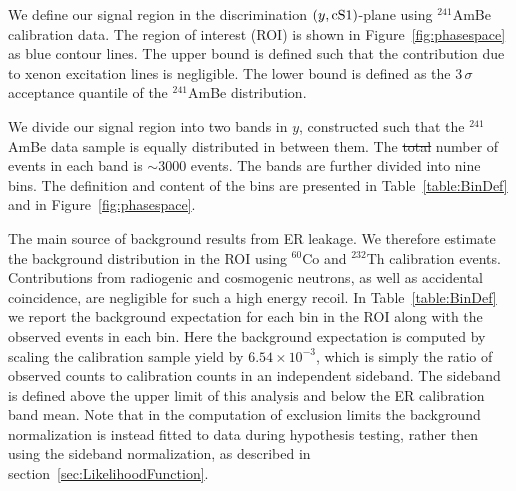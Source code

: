 We define our signal region in the discrimination $(y,\mathrm{cS1})$-plane using $^{241}$AmBe calibration data. 
The region of interest (ROI) is shown in Figure~\ref{fig:phasespace} as blue contour lines. The upper bound is defined such that the contribution due to xenon excitation lines is negligible. The lower bound is defined as the 3\,$\sigma$ acceptance quantile of the $^{241}$AmBe distribution.

We divide our signal region into two bands in $y$, constructed such that the $^{241}$AmBe data sample is equally distributed in between them. The \sout{total} number of events in each band is $\sim3000$ events. The bands are further divided into nine bins. The definition and content of the bins are presented in Table~\ref{table:BinDef} and in Figure~\ref{fig:phasespace}. 

The main source of background results from ER leakage. We therefore estimate the background distribution in the ROI using $^{60}$Co and $^{232}$Th calibration events.  
Contributions from radiogenic and cosmogenic neutrons, as well as accidental coincidence, are negligible for such a high energy recoil. In Table~\ref{table:BinDef} we report the background expectation for each bin in the ROI along with the observed events in each bin. Here the background expectation is computed by scaling the calibration sample yield by $6.54\times10^{-3}$, which is simply the ratio of observed counts to calibration counts in an independent sideband. The sideband is defined above the upper limit of this analysis and below the ER calibration band mean. Note that in the computation of exclusion limits the background normalization is instead fitted to data during hypothesis testing, rather then using the sideband normalization, as described in section~\ref{sec:LikelihoodFunction}. 



